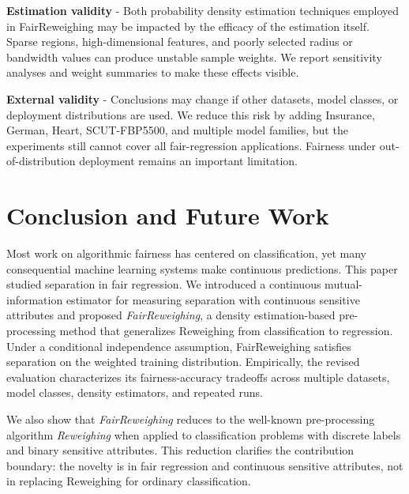 \noindent\textbf{Estimation validity} - Both probability density estimation techniques employed in FairReweighing may be impacted by the efficacy of the estimation itself. Sparse regions, high-dimensional features, and poorly selected radius or bandwidth values can produce unstable sample weights. We report sensitivity analyses and weight summaries to make these effects visible.

\noindent\textbf{External validity} - Conclusions may change if other datasets, model classes, or deployment distributions are used. We reduce this risk by adding Insurance, German, Heart, SCUT-FBP5500, and multiple model families, but the experiments still cannot cover all fair-regression applications. Fairness under out-of-distribution deployment remains an important limitation.


\section{Conclusion and Future Work}
\label{sect:Conclusion}

Most work on algorithmic fairness has centered on classification, yet many consequential machine learning systems make continuous predictions. This paper studied separation in fair regression. We introduced a continuous mutual-information estimator for measuring separation with continuous sensitive attributes and proposed \emph{FairReweighing}, a density estimation-based pre-processing method that generalizes Reweighing from classification to regression. Under a conditional independence assumption, FairReweighing satisfies separation on the weighted training distribution. Empirically, the revised evaluation characterizes its fairness-accuracy tradeoffs across multiple datasets, model classes, density estimators, and repeated runs.

We also show that \emph{FairReweighing} reduces to the well-known pre-processing algorithm \emph{Reweighing} when applied to classification problems with discrete labels and binary sensitive attributes. This reduction clarifies the contribution boundary: the novelty is in fair regression and continuous sensitive attributes, not in replacing Reweighing for ordinary classification.

